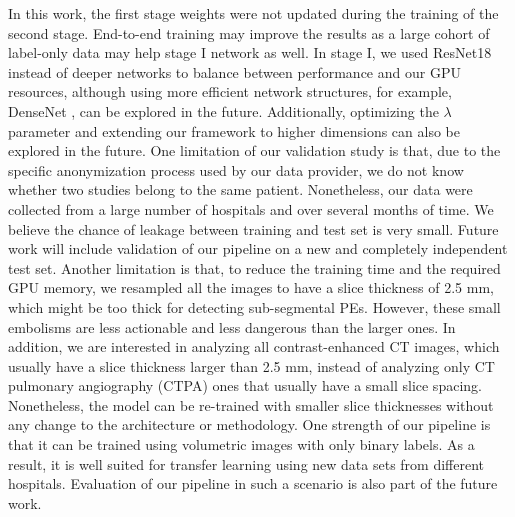 \documentclass{midl} %
\begin{document}
In this work, the first stage weights were not updated during the training of the second stage. End-to-end training may improve the results as a large cohort of label-only data may help stage I network as well. In stage I, we used ResNet18 instead of deeper networks to balance between performance and our GPU resources, although using more efficient network structures, for example, DenseNet \cite{huang2017densely}, can be explored in the future. Additionally, optimizing the $\lambda$ parameter and extending our framework to higher dimensions \cite{van2019stacked} can also be explored in the future. One limitation of our validation study is that, due to the specific anonymization process used by our data provider, we do not know whether two studies belong to the same patient. Nonetheless, our data were collected from a large number of hospitals and over several months of time. We believe the chance of leakage between training and test set is very small. Future work will include validation of our pipeline on a new and completely independent test set. Another limitation is that, to reduce the training time and the required GPU memory, we resampled all the images to have a slice thickness of 2.5 mm, which might be too thick for detecting sub-segmental PEs. However, these small embolisms are less actionable and less dangerous than the larger ones. In addition, we are interested in analyzing all contrast-enhanced CT images, which usually have a slice thickness larger than 2.5 mm, instead of analyzing only CT pulmonary angiography (CTPA) ones that usually have a small slice spacing. Nonetheless, the model can be re-trained with smaller slice thicknesses without any change to the architecture or methodology. One strength of our pipeline is that it can be trained using volumetric images with only binary labels. As a result, it is well suited for transfer learning using new data sets from different hospitals. Evaluation of our pipeline in such a scenario is also part of the future work. 



\end{document}
